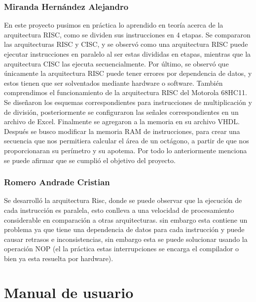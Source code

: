 \documentclass{IEEEtran}
\begin{document}
\subsubsection{Miranda Hernández Alejandro}
\label{sec:org3833eae}
En este proyecto pusimos en práctica lo aprendido en teoría acerca de la arquitectura RISC, como se dividen sus instrucciones en 4 etapas. Se compararon las arquitecturas RISC y CISC, y se observó como una arquitectura RISC puede ejecutar instrucciones en paralelo al ser estas divididas en etapas, mientras que la arquitectura CISC las ejecuta secuencialmente. Por último, se observó que únicamente la arquitectura RISC puede tener errores por dependencia de datos, y estos tienen que ser solventados mediante hardware o software.
También comprendimos el funcionamiento de la arquitectura RISC del Motorola 68HC11. Se diseñaron los esquemas correspondientes para instrucciones de multiplicación y de división, posteriormente se configuraron las señales correspondientes en un archivo de Excel. Finalmente se agregaron a la memoria en su archivo VHDL.
Después se busco modificar la memoria RAM de instrucciones, para crear una secuencia que nos permitiera calcular el área de un octágono, a partir de que nos proporcionaran su perímetro y su apotema. Por todo lo anteriormente menciona se puede afirmar que se cumplió el objetivo del proyecto.


\subsubsection{Romero Andrade Cristian}
\label{sec:orgd2c772b}
Se desarrolló la arquitectura Risc, donde se puede observar que la ejecución de cada instrucción es paralela, esto conlleva a una velocidad de procesamiento considerable en comparación a otras arquitecturas. sin embargo esta contiene un problema ya que tiene una dependencia de datos para cada instrucción y puede causar retrasos e inconsistencias, sin embargo esta se puede solucionar usando la operación NOP (el la práctica estas interrupciones se encarga el compilador o bien ya esta resuelta por hardware).
\section{Manual de usuario}
\label{sec:org9226fb9}
\end{document}
